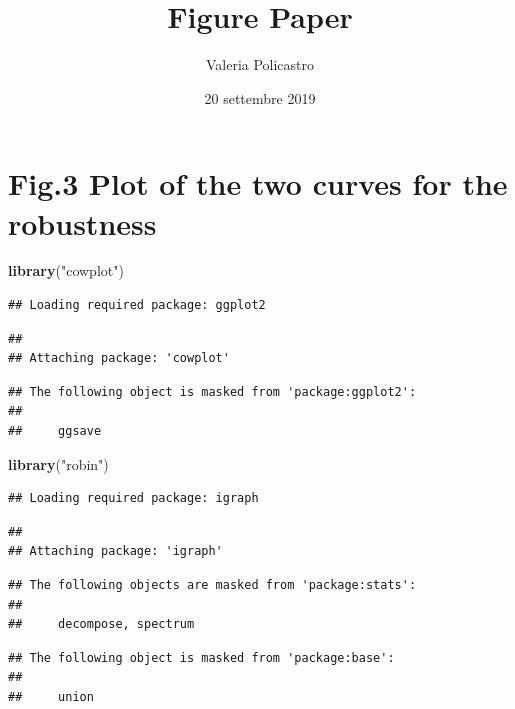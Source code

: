 \documentclass[]{article}
\title{Figure Paper}
\author{Valeria Policastro}
\date{20 settembre 2019}
\newenvironment{Shaded}{\begin{snugshade}}{\end{snugshade}}
\newcommand{\KeywordTok}[1]{\textcolor[rgb]{0.13,0.29,0.53}{\textbf{#1}}}
\newcommand{\StringTok}[1]{\textcolor[rgb]{0.31,0.60,0.02}{#1}}
\newcommand{\NormalTok}[1]{#1}
\begin{document}
\maketitle

\section{Fig.3 Plot of the two curves for the
robustness}\label{fig.3-plot-of-the-two-curves-for-the-robustness}

\begin{Shaded}
\begin{Highlighting}[]
\KeywordTok{library}\NormalTok{(}\StringTok{"cowplot"}\NormalTok{)}
\end{Highlighting}
\end{Shaded}

\begin{verbatim}
## Loading required package: ggplot2
\end{verbatim}

\begin{verbatim}
## 
## Attaching package: 'cowplot'
\end{verbatim}

\begin{verbatim}
## The following object is masked from 'package:ggplot2':
## 
##     ggsave
\end{verbatim}

\begin{Shaded}
\begin{Highlighting}[]
\KeywordTok{library}\NormalTok{(}\StringTok{"robin"}\NormalTok{)}
\end{Highlighting}
\end{Shaded}

\begin{verbatim}
## Loading required package: igraph
\end{verbatim}

\begin{verbatim}
## 
## Attaching package: 'igraph'
\end{verbatim}

\begin{verbatim}
## The following objects are masked from 'package:stats':
## 
##     decompose, spectrum
\end{verbatim}

\begin{verbatim}
## The following object is masked from 'package:base':
## 
##     union
\end{verbatim}
\end{document}
